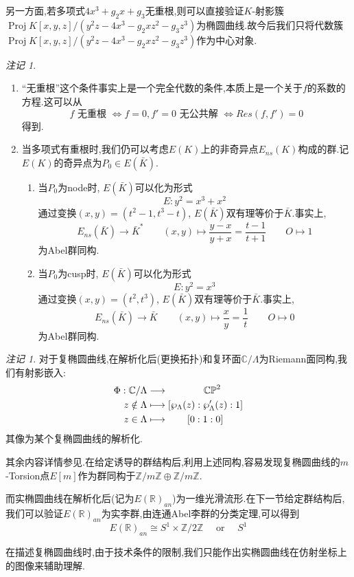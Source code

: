 \documentclass[12pt,A4paper,oneside,reqno]{amsart}
\numberwithin{equation}{section}
\theoremstyle{definition}
\theoremstyle{plain}
\theoremstyle{plain}
\numberwithin{equation}{section}
\theoremstyle{remark}
\newtheorem{remark}[theorem]{注记}
\newtheorem{remarks}[theorem]{注记}
\DeclareMathOperator{\Proj}{\operatorname{Proj}}
\begin{document}
另一方面,若多项式$4x^3+g_2x+g_3$无重根,则可以直接验证$K$-射影簇$\Proj K[x,y,z]/(y^2z-4x^3-g_2xz^2-g_3z^3)$为椭圆曲线.故今后我们只将代数簇$\Proj K[x,y,z]/(y^2z-4x^3-g_2xz^2-g_3z^3)$作为中心对象.
\begin{remarks}\
	\begin{enumerate}
		\item “无重根”这个条件事实上是一个完全代数的条件,本质上是一个关于$f$的系数的方程.这可以从
		$$f\text{ 无重根 } \Leftrightarrow f=0,f'=0 \text{ 无公共解 }\Leftrightarrow Res(f,f')=0$$
		得到.
		\item 当多项式有重根时,我们仍可以考虑$E(K)$上的非奇异点$E_{ns}(K)$构成的群.记$E(K)$的奇异点为$P_0 \in E(\bar{K})$.
		\begin{enumerate}
			\item 当$P_0$为node时, $E(\bar{K})$可以化为形式$$E:y^2=x^3+x^2$$
			通过变换$(x,y)=(t^2-1,t^3-t)$, $E(\bar{K})$双有理等价于$\bar{K}$.事实上,
			$$E_{ns}(\bar{K}) \longrightarrow \bar{K}^{*} \qquad (x,y) \longmapsto \frac{y-x}{y+x}=\frac{t-1}{t+1} \qquad O \longmapsto 1$$
			为Abel群同构.
			\item 当$P_0$为cusp时, $E(\bar{K})$可以化为形式$$E:y^2=x^3$$
			通过变换$(x,y)=(t^2,t^3)$, $E(\bar{K})$双有理等价于$\bar{K}$.事实上,
			$$E_{ns}(\bar{K}) \longrightarrow \bar{K} \qquad (x,y) \longmapsto \frac{x}{y}=\frac{1}{t} \qquad O \longmapsto 0$$
			为Abel群同构.			
		\end{enumerate}
	\end{enumerate}
	
\end{remarks}
\begin{remark}
	对于复椭圆曲线,在解析化后(更换拓扑)和复环面$\mathbb{C}/\Lambda$为Riemann面同构,我们有射影嵌入:
	\begin{equation}\label{eq:proembed}
	\begin{aligned}
	\Phi: \mathbb{C}/\Lambda &\longrightarrow \hspace{1.3cm}\mathbb{CP}^2\\
	z \notin \Lambda &\longmapsto [\wp_{\Lambda}(z):\wp'_{\Lambda}(z):1]\\
	z \in \Lambda &\longmapsto\hspace{0.7cm} [0:1:0]\\
	\end{aligned}
	\end{equation}
	其像为某个复椭圆曲线的解析化.
	
	其余内容详情参见\cite[第二,八章]{Li2019modularform}.在给定诱导的群结构后,利用上述同构,容易发现复椭圆曲线的$m$-Torsion点$E[m]$作为群同构于$\mathbb{Z}/m\mathbb{Z} \oplus \mathbb{Z}/m\mathbb{Z}$.
	
	而实椭圆曲线在解析化后(记为$E(\mathbb{R})_{an}$)为一维光滑流形.在下一节给定群结构后,我们可以验证$E(\mathbb{R})_{an}$为实李群,由连通Abel李群的分类定理,可以得到
	$$E(\mathbb{R})_{an} \cong S^1 \times \mathbb{Z}/2\mathbb{Z} \quad\text{ or }\quad S^1$$
	
	在描述复椭圆曲线时,由于技术条件的限制,我们只能作出实椭圆曲线在仿射坐标上的图像来辅助理解.
\end{remark}
\end{document}
